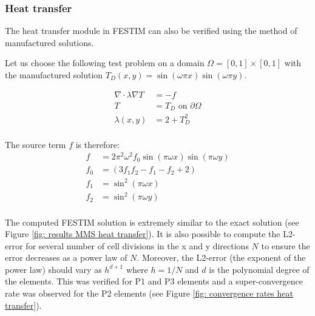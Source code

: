 \subsubsection{Heat transfer}

The heat transfer module in FESTIM can also be verified using the method of manufactured solutions.

Let us choose the following test problem on a domain $\Omega = [0, 1] \times [0, 1]$ with the manufactured solution $T_D(x, y) = \sin(\omega \pi x) \sin(\omega \pi y)$.

\begin{align}
    \nabla \cdot \lambda \nabla T &= -f \\
    T &= T_D \text{  on  } \partial \Omega \\
    \lambda(x, y) &= 2 + T_D^2 \\
\end{align}

The source term $f$ is therefore:
\begin{align}
    f &= 2 \pi^{2} \omega^{2} f_0 \sin{\left (\pi \omega x \right )} \sin{\left (\pi \omega y \right )} \\
    f_0 &= \left(3 f_1 f_2 - f_1 - f_2 + 2\right) \\
    f_1 &= \sin^{2}{\left (\pi \omega x \right )} \\
    f_2 &= \sin^{2}{\left (\pi \omega y \right )} \\
\end{align}

The computed FESTIM solution is extremely similar to the exact solution (see Figure \ref{fig: results MMS heat transfer}).
It is also possible to compute the L2-error for several number of cell divisions in the x and y directions $N$ to ensure the error decreases as a power law of $N$.
Moreover, the L2-error (the exponent of the power law) should vary as $h^{d+1}$ where $h=1/N$ and $d$ is the polynomial degree of the elements.
This was verified for P1 and P3 elements and a super-convergence rate was observed for the P2 elements (see Figure \ref{fig: convergence rates heat transfer}).

